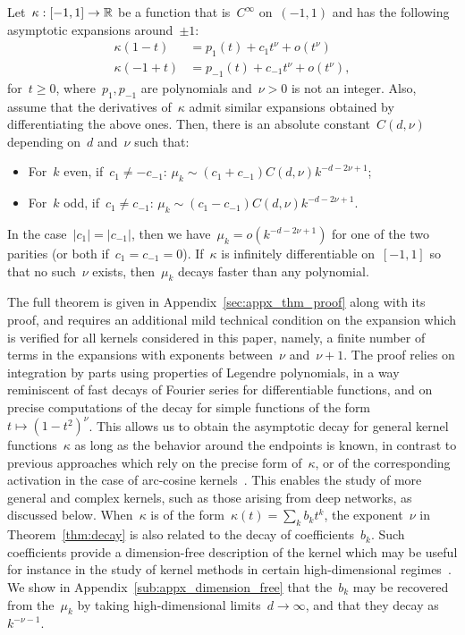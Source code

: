 \begin{theorem}
\label{thm:decay}
Let~$\kappa: [-1,1] \to {\mathbb R}$ be a function that is~$C^\infty$ on~$(-1,1)$ and has the following asymptotic expansions around~$\pm 1$:
\begin{align}
\kappa(1-t) &= p_1(t) + c_{1} t^{\nu} + o(t^{\nu}) \\
\kappa(-1+t) &= p_{-1}(t) + c_{-1} t^{\nu} + o(t^{\nu}),
\end{align}
for~$t \geq 0$, where~$p_1, p_{-1}$ are polynomials and~$\nu > 0$ is not an integer.
Also, assume that the derivatives of~$\kappa$ admit similar expansions obtained by differentiating the above ones.
Then, there is an absolute constant~$C(d,\nu)$ depending on~$d$ and~$\nu$ such that:
\begin{itemize}[noitemsep]
	\item For~$k$ even, if~$c_1 \ne -c_{-1}$: $\mu_k \sim (c_1 + c_{-1}) C(d,\nu) k^{-d-2 \nu + 1}$;
	\item For~$k$ odd, if~$c_1 \ne c_{-1}$: $\mu_k \sim (c_1 - c_{-1}) C(d,\nu) k^{-d-2 \nu + 1}$.
\end{itemize}
In the case~$|c_1| = |c_{-1}|$, then we have~$\mu_k = o(k^{-d-2 \nu + 1})$ for one of the two parities (or both if~$c_1 = c_{-1} = 0$).
If~$\kappa$ is infinitely differentiable on~$[-1, 1]$ so that no such~$\nu$ exists, then~$\mu_k$ decays faster than any polynomial.
\end{theorem}

The full theorem is given in Appendix~\ref{sec:appx_thm_proof} along with its proof, and requires an additional mild technical condition on the expansion which is verified for all kernels considered in this paper, namely, a finite number of terms in the expansions with exponents between~$\nu$ and~$\nu+1$.
The proof relies on integration by parts using properties of Legendre polynomials, in a way reminiscent of fast decays of Fourier series for differentiable functions, and on precise computations of the decay for simple functions of the form~$t \mapsto (1 - t^2)^\nu$.
This allows us to obtain the asymptotic decay for general kernel functions~$\kappa$ as long as the behavior around the endpoints is known, in contrast to previous approaches which rely on the precise form of~$\kappa$, or of the corresponding activation in the case of arc-cosine kernels~\citep{bach2017breaking,basri2019convergence,bietti2019inductive,geifman2020similarity}.
This enables the study of more general and complex kernels, such as those arising from deep networks, as discussed below.
When~$\kappa$ is of the form~$\kappa(t) = \sum_k b_k t^k$, the exponent~$\nu$ in Theorem~\ref{thm:decay} is also related to the decay of coefficients~$b_k$.
Such coefficients provide a dimension-free description of the kernel which may be useful for instance in the study of kernel methods in certain high-dimensional regimes~\citep[see, \eg,][]{el2010spectrum,ghorbani2019linearized,liang2019risk}.
We show in Appendix~\ref{sub:appx_dimension_free} that the~$b_k$ may be recovered from the~$\mu_k$ by taking high-dimensional limits~$d \to \infty$, and that they decay as~$k^{-\nu-1}$.



